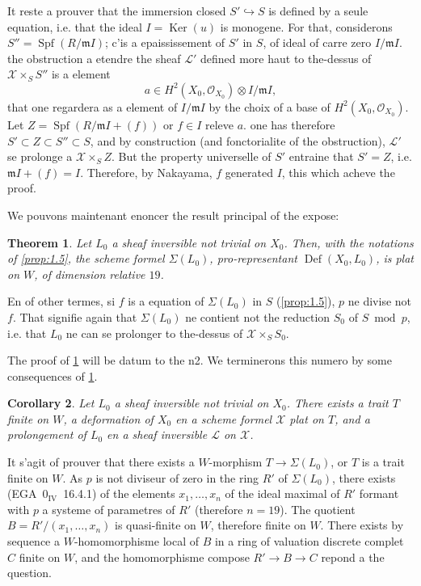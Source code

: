 \documentclass[12pt,a4paper]{article}
\theoremstyle{plain}
\newtheorem{theorem}{Theorem}[section]
\newtheorem{corollary}[theorem]{Corollary}
\theoremstyle{definition}
\theoremstyle{remark}
\DeclareMathOperator{\Def}{Def}
\DeclareMathOperator{\Spf}{Spf}
\DeclareMathOperator{\Ker}{Ker}
\begin{document}
It reste a prouver that the immersion closed $S' \hookrightarrow S$ is defined by a seule equation, i.e. that the ideal $I = \Ker(u)$ is monogene. For that, considerons $S'' = \Spf(R/\mathfrak{m}I)$; c'is a epaississement of $S'$ in $S$, of ideal of carre zero $I/\mathfrak{m}I$. the obstruction a etendre the sheaf $\mathcal{L}'$ defined more haut to the-dessus of $\mathcal{X} \times_S S''$ is a element
\[
a \in H^2(X_0, \mathcal{O}_{X_0}) \otimes I/\mathfrak{m}I,
\]
that one regardera as a element of $I/\mathfrak{m}I$ by the choix of a base of $H^2(X_0, \mathcal{O}_{X_0})$. Let $Z = \Spf(R/\mathfrak{m}I + (f))$ or $f \in I$ releve $a$. one has therefore $S' \subset Z \subset S'' \subset S$, and by construction (and fonctorialite of the obstruction), $\mathcal{L}'$ se prolonge a $\mathcal{X} \times_S Z$. But the property universelle of $S'$ entraine that $S' = Z$, i.e. $\mathfrak{m}I + (f) = I$. Therefore, by Nakayama, $f$ generated $I$, this which acheve the proof.

\medskip
We pouvons maintenant enoncer the result principal of the expose:

\begin{theorem}\label{thm:1.6}
Let $L_0$ a sheaf inversible not trivial on $X_0$. Then, with the notations of \ref{prop:1.5}, the scheme formel $\Sigma(L_0)$, pro-representant $\Def(X_0, L_0)$, is plat on $W$, of dimension relative $19$.
\end{theorem}

En of other termes, si $f$ is a equation of $\Sigma(L_0)$ in $S$ (\ref{prop:1.5}), $p$ ne divise not $f$. That signifie again that $\Sigma(L_0)$ ne contient not the reduction $S_0$ of $S \bmod p$, i.e. that $L_0$ ne can se prolonger to the-dessus of $\mathcal{X} \times_S S_0$.

The proof of \ref{thm:1.6} will be datum to the n2. We terminerons this numero by some consequences of \ref{thm:1.6}.

\begin{corollary}\label{cor:1.7}
Let $L_0$ a sheaf inversible not trivial on $X_0$. There exists a trait $T$ finite on $W$, a deformation of $X_0$ en a scheme formel $\mathcal{X}$ plat on $T$, and a prolongement of $L_0$ en a sheaf inversible $\mathcal{L}$ on $\mathcal{X}$.
\end{corollary}

It s'agit of prouver that there exists a $W$-morphism $T \to \Sigma(L_0)$, or $T$ is a trait finite on $W$. As $p$ is not diviseur of zero in the ring $R'$ of $\Sigma(L_0)$, there exists (EGA~0$_{\mathrm{IV}}$~16.4.1) of the elements $x_1, \ldots, x_n$ of the ideal maximal of $R'$ formant with $p$ a systeme of parametres of $R'$ (therefore $n = 19$). The quotient $B = R'/(x_1, \ldots, x_n)$ is quasi-finite on $W$, therefore finite on $W$. There exists by sequence a $W$-homomorphisme local of $B$ in a ring of valuation discrete complet $C$ finite on $W$, and the homomorphisme compose $R' \to B \to C$ repond a the question.
\end{document}
